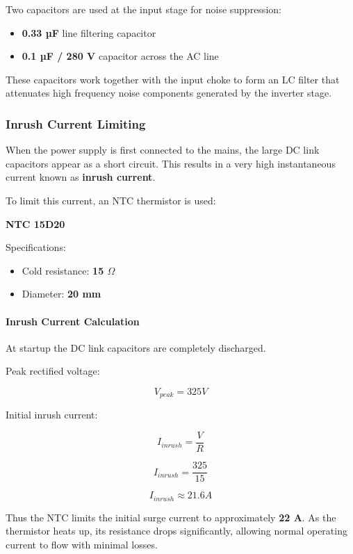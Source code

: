 Two capacitors are used at the input stage for noise suppression:

\begin{itemize}
\item \textbf{0.33 µF} line filtering capacitor
\item \textbf{0.1 µF / 280 V} capacitor across the AC line
\end{itemize}

These capacitors work together with the input choke to form an LC filter that attenuates high frequency noise components generated by the inverter stage.

\subsubsection{Inrush Current Limiting}

When the power supply is first connected to the mains, the large DC link capacitors appear as a short circuit. This results in a very high instantaneous current known as \textbf{inrush current}.

To limit this current, an NTC thermistor is used:

\begin{center}
\textbf{NTC 15D20}
\end{center}

Specifications:

\begin{itemize}
\item Cold resistance: \textbf{15 $\Omega$}
\item Diameter: \textbf{20 mm}
\end{itemize}

\paragraph{Inrush Current Calculation}

At startup the DC link capacitors are completely discharged.

Peak rectified voltage:

\[
V_{peak} = 325V
\]

Initial inrush current:

\[
I_{inrush} = \frac{V}{R}
\]

\[
I_{inrush} = \frac{325}{15}
\]

\[
I_{inrush} \approx 21.6A
\]

Thus the NTC limits the initial surge current to approximately \textbf{22 A}. As the thermistor heats up, its resistance drops significantly, allowing normal operating current to flow with minimal losses.

